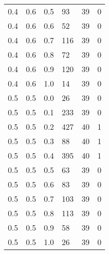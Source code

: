 \begin{table}[!htb]
\begin{minipage}{.45\linewidth}
\begin{tabular}{||p{}p{}p{}p{}p{}p{}||}
			0.4 & 0.6 & 0.5 & 93 & 39 & 0 \\ 
			0.4 & 0.6 & 0.6 & 52 & 39 & 0 \\ 
			0.4 & 0.6 & 0.7 & 116 & 39 & 0 \\ 
			0.4 & 0.6 & 0.8 & 72 & 39 & 0 \\ 
			0.4 & 0.6 & 0.9 & 120 & 39 & 0 \\ 
			0.4 & 0.6 & 1.0 & 14 & 39 & 0  \\ \hline
			0.5 & 0.5 & 0.0 & 26 & 39 & 0 \\ 
			0.5 & 0.5 & 0.1 & 233 & 39 & 0 \\ 
			0.5 & 0.5 & 0.2 & 427 & 40 & 1 \\ 
			0.5 & 0.5 & 0.3 & 88 & 40 & 1 \\ 
			0.5 & 0.5 & 0.4 & 395 & 40 & 1 \\ 
			0.5 & 0.5 & 0.5 & 63 & 39 & 0 \\ 
			0.5 & 0.5 & 0.6 & 83 & 39 & 0 \\ 
			0.5 & 0.5 & 0.7 & 103 & 39 & 0 \\ 
			0.5 & 0.5 & 0.8 & 113 & 39 & 0 \\ 
			0.5 & 0.5 & 0.9 & 58 & 39 & 0 \\ 
			0.5 & 0.5 & 1.0 & 26 & 39 & 0  \\ \hline
			
		\end{tabular}
	\end{minipage} 
\end{table} 

